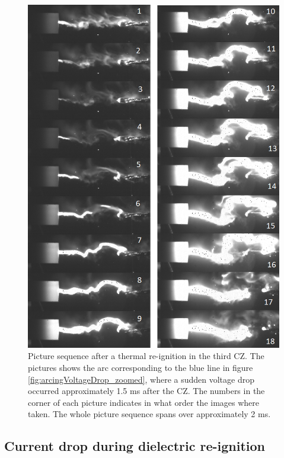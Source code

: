 \documentclass[10pt,b5paper,twoside]{article}
\begin{document}
\begin{figure}[H]
\centering
\includegraphics[scale=0.67, angle =0 ]{Bilder/Results/301_23_TR_TR_drop.png}
\caption{Picture sequence after a thermal re-ignition in the third CZ. The pictures shows the arc corresponding to the blue line in figure \ref{fig:arcingVoltageDrop_zoomed}, where a sudden voltage drop occurred approximately 1.5 ms after the CZ. The numbers in the corner of each picture indicates in what order the images where taken. The whole picture sequence spans over approximately 2 ms.} \label{fig:arcingVoltage_drop_301_blue}
\end{figure}

\newpage
\subsection{Current drop during dielectric re-ignition} \label{sec:dielectricReIgnitionResults}
\end{document}
